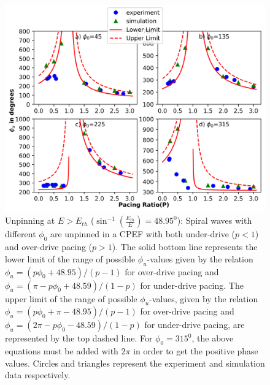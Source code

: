 \documentclass[%
 preprint,
 amsmath,amssymb,
 aps,
]{revtex4-2}
\begin{document}
\iffalse
\begin{figure}[H]
    \centering
    \includegraphics{E>Eth.png}
    \caption{Unpinning at $E>E_{th}$ 
    (${\sin^{-1}}{(\frac{E_{th}}{E})}=48.95^0$): Spiral waves with different ${\phi}_0$ are unpinned in a CPEF with both under-drive ($p<1$) and over-drive pacing ($p>1$). The solid bottom line represents the lower limit of the range of possible ${\phi}_u$-values given by the relation
    ${\phi}_u=(p{\phi}_0+48.95)/(p-1)$ for over-drive pacing and ${\phi}_u=(\pi-p{\phi}_0+48.59)/(1-p)$ for under-drive pacing. The upper limit of the range of possible ${\phi}_u$-values, given by the relation ${\phi}_u=(p{\phi}_0+\pi-48.95)/(p-1)$ for over-drive pacing and ${\phi}_u=(2\pi-p{\phi}_0-48.59)/(1-p)$ for under-drive pacing, are represented by the top dashed line. For ${\phi}_0 = 315^0$, the above equations must be added with $2\pi$ in order to get the positive phase values.
    Circles and triangles represent the experiment and simulation data respectively. 
    }
    \label{fig:unpinning_E>Eth}
\end{figure}
%
\end{document}
